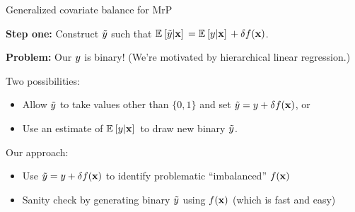 

\begin{frame}[t]{Generalized covariate balance for MrP}

\textbf{Step one:} Construct
$\tilde{y}$ such that $\mathbb{E}_{}\left[ \tilde{y} \vert \mathbf{x}\right]\, = \mathbb{E}_{}\left[ y \vert \mathbf{x}\right]\, + \delta f(\mathbf{x})$.
\pause

\textbf{Problem:} Our $y$ is binary!  (We're motivated by hierarchical linear regression.)

\pause
Two possibilities:
%
\begin{itemize}
    \item Allow $\tilde{y}$ to take values other than $\{0,1\}$ and set
        $\tilde{y} = y + \delta f(\mathbf{x})$, or
    \item Use an estimate of $\mathbb{E}_{}\left[ y \vert \mathbf{x}\right]\,$ to draw new binary $\tilde{y}$.
\end{itemize}
%
Our approach:
%
\begin{itemize}
    \item Use $\tilde{y} = y + \delta f(\mathbf{x})$ to identify problematic ``imbalanced'' $f(\mathbf{x})$
    \item Sanity check by generating binary $\tilde{y}$ using $f(\mathbf{x})$ (which is fast and easy)
\end{itemize}


\end{frame}




